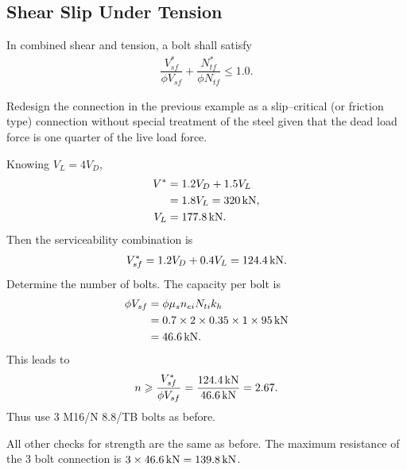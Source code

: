 \subsection{Shear Slip Under Tension}\label{sec:bolt_combined_s}
In combined shear and tension, a bolt shall satisfy
\begin{gather}
\dfrac{V^*_{sf}}{\phi{}V_{sf}}+\dfrac{N^*_{tf}}{\phi{}N_{tf}}\leqslant1.0.
\end{gather}
\begin{figure}[H]
\centering
\end{figure}

\begin{exmp}
Redesign the connection in the previous example as a slip--critical (or friction type) connection without special treatment of the steel given that the dead load force is one quarter of the live load force.
\end{exmp}
\begin{solution}
Knowing $V_L=4V_D$,
\begin{align*}
V^*&=1.2V_D+1.5V_L\\&=1.8V_L=\SI{320}{\kilo\newton},\\
V_L&=\SI{177.8}{\kilo\newton}.
\end{align*}
Then the serviceability combination is
\begin{gather*}
V^*_{sf}=1.2V_D+0.4V_L=\SI{124.4}{\kilo\newton}.
\end{gather*}
Determine the number of bolts. The capacity per bolt is
\begin{align*}
\phi{}V_{sf}&=\phi{}\mu_sn_{ei}N_{ti}k_h\\
&=0.7\times2\times0.35\times1\times\SI{95}{\kilo\newton}\\
&=\SI{46.6}{\kilo\newton}.
\end{align*}
This leads to
\begin{gather*}
n\geqslant\dfrac{V^*_{sf}}{\phi{}V_{sf}}=\dfrac{\SI{124.4}{\kilo\newton}}{\SI{46.6}{\kilo\newton}}=2.67.
\end{gather*}
Thus use 3 M16/N 8.8/TB bolts as before.

All other checks for strength are the same as before. The maximum resistance of the 3 bolt connection is $3\times\SI{46.6}{\kilo\newton}=\SI{139.8}{\kilo\newton}$.
\end{solution}